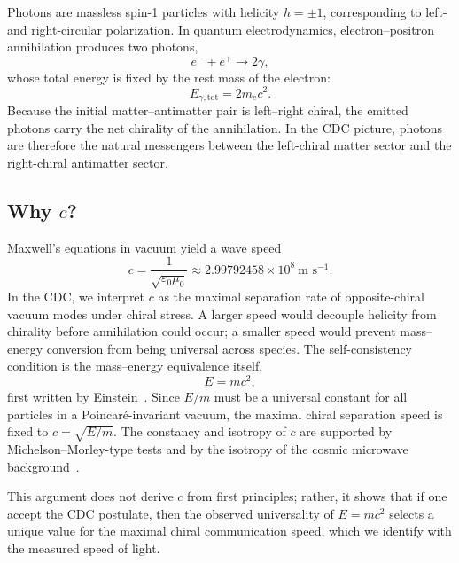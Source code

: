 \documentclass[11pt,a4paper]{article}
\begin{document}
Photons are massless spin-1 particles with helicity $h=\pm1$, corresponding to left- and right-circular polarization. In quantum electrodynamics, electron--positron annihilation produces two photons,
\begin{equation}
e^-+e^+\to 2\gamma,
\end{equation}
whose total energy is fixed by the rest mass of the electron:
\begin{equation}
E_{\gamma,\text{tot}}=2m_ec^2.
\end{equation}
Because the initial matter--antimatter pair is left--right chiral, the emitted photons carry the net chirality of the annihilation. In the CDC picture, photons are therefore the natural messengers between the left-chiral matter sector and the right-chiral antimatter sector.

\subsection*{Why $c$?}

Maxwell's equations in vacuum yield a wave speed
\begin{equation}
c=\frac{1}{\sqrt{\varepsilon_0\mu_0}}\approx 2.99792458\times10^8~\text{m s}^{-1}.
\end{equation}
In the CDC, we interpret $c$ as the maximal separation rate of opposite-chiral vacuum modes under chiral stress. A larger speed would decouple helicity from chirality before annihilation could occur; a smaller speed would prevent mass--energy conversion from being universal across species. The self-consistency condition is the mass--energy equivalence itself,
\begin{equation}
E=mc^2,
\end{equation}
first written by Einstein~\cite{einstein1905}. Since $E/m$ must be a universal constant for all particles in a Poincar\'e-invariant vacuum, the maximal chiral separation speed is fixed to $c=\sqrt{E/m}$. The constancy and isotropy of $c$ are supported by Michelson--Morley-type tests and by the isotropy of the cosmic microwave background~\cite{michelson1887,planck2020}.

This argument does not derive $c$ from first principles; rather, it shows that if one accept the CDC postulate, then the observed universality of $E=mc^2$ selects a unique value for the maximal chiral communication speed, which we identify with the measured speed of light.
\end{document}
